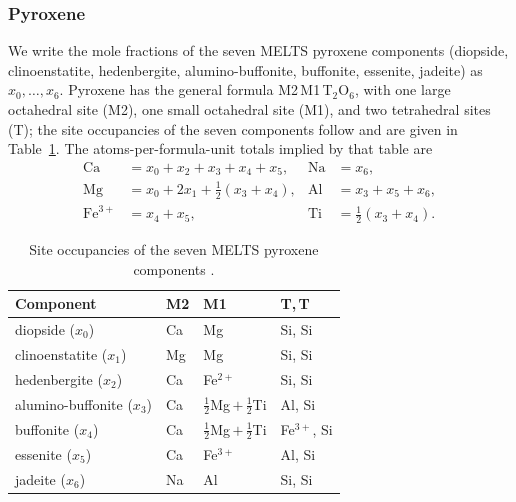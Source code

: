 \subsubsection{Pyroxene} We write the mole fractions of the seven \textsc{MELTS} pyroxene
components (diopside, clinoenstatite, hedenbergite, alumino-buffonite, buffonite,
essenite, jadeite) as $x_0,\dots,x_6$. Pyroxene has the general formula
M2\,M1\,T$_2$O$_6$, with one large octahedral site (M2), one small octahedral site
(M1), and two tetrahedral sites (T); the site occupancies of the seven components
follow \citet{sackghiorso1994} and are given in Table~\ref{tab:pxsites}. The
atoms-per-formula-unit totals implied by that table are
\begin{align}
  \mathrm{Ca} &= x_0+x_2+x_3+x_4+x_5, &
  \mathrm{Na} &= x_6, \nonumber\\
  \mathrm{Mg} &= x_0+2x_1+\tfrac12(x_3+x_4), &
  \mathrm{Al} &= x_3+x_5+x_6, \label{eq:pxapfu}\\
  \mathrm{Fe}^{3+} &= x_4+x_5, &
  \mathrm{Ti} &= \tfrac12(x_3+x_4). \nonumber
\end{align}

\begin{table}[t]
\centering
\caption{Site occupancies of the seven \textsc{MELTS} pyroxene components
\citep{sackghiorso1994}.}
\label{tab:pxsites}
\begin{tabular}{llll}
\toprule
Component & M2 & M1 & T,\,T \\
\midrule
diopside ($x_0$)            & Ca & Mg                            & Si, Si \\
clinoenstatite ($x_1$)      & Mg & Mg                            & Si, Si \\
hedenbergite ($x_2$)        & Ca & Fe$^{2+}$                     & Si, Si \\
alumino-buffonite ($x_3$)   & Ca & $\tfrac12$Mg\,$+\,\tfrac12$Ti & Al, Si \\
buffonite ($x_4$)           & Ca & $\tfrac12$Mg\,$+\,\tfrac12$Ti & Fe$^{3+}$, Si \\
essenite ($x_5$)            & Ca & Fe$^{3+}$                     & Al, Si \\
jadeite ($x_6$)             & Na & Al                            & Si, Si \\
\bottomrule
\end{tabular}
\end{table}

